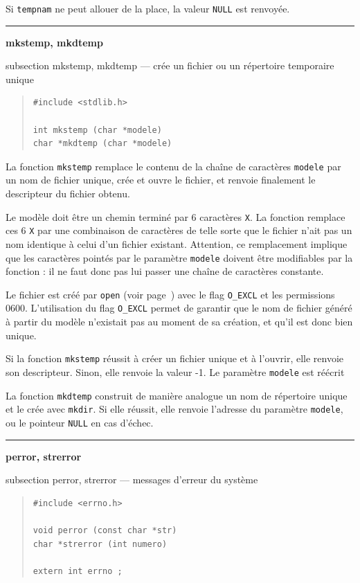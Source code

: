 \documentclass [twoside] {report}
\newcommand {\primitive} [1]
    {
	\phantomsection
	{\large \textbf {#1}}
	\addcontentsline {toc} {subsection} {#1}
    }
\newcommand {\separation}
    {
	\vspace {5mm}
	\nopagebreak
	\hrule
    }
\begin{document}
Si \texttt {tempnam} ne peut allouer de la place, la valeur \texttt {NULL} est
renvoyée.



\separation 
\primitive {mkstemp, mkdtemp} --- crée un fichier ou un répertoire temporaire unique
    \label {mkstemp}

\begin {quote}
\begin {verbatim}
#include <stdlib.h>

int mkstemp (char *modele)
char *mkdtemp (char *modele)
\end{verbatim}
\end {quote}

La fonction \texttt {mkstemp} remplace le contenu de la chaîne de
caractères \texttt {modele} par un nom de fichier unique, crée et
ouvre le fichier, et renvoie finalement le descripteur du fichier obtenu.

Le modèle doit être un chemin terminé par 6 caractères \texttt{X}. La
fonction remplace ces 6 \texttt{X} par une combinaison de caractères
de telle sorte que le fichier n'ait pas un nom identique à celui d'un
fichier existant. Attention, ce remplacement implique que les caractères
pointés par le paramètre \texttt{modele} doivent être modifiables par
la fonction : il ne faut donc pas lui passer une chaîne de caractères
constante.

Le fichier est créé par \texttt {open} (voir page~\pageref {open})
avec le flag \texttt{O\_EXCL} et les permissions 0600. L'utilisation du
flag \texttt{O\_EXCL} permet de garantir que le nom de fichier généré
à partir du modèle n'existait pas au moment de sa création, et qu'il
est donc bien unique.

Si la fonction \texttt {mkstemp} réussit à créer un fichier unique
et à l'ouvrir, elle renvoie son descripteur. Sinon, elle renvoie la
valeur -1. Le paramètre \texttt{modele} est réécrit 

La fonction \texttt {mkdtemp} construit de manière analogue un nom de
répertoire unique et le crée avec \texttt {mkdir}. Si elle réussit,
elle renvoie l'adresse du paramètre \texttt{modele}, ou le pointeur
\texttt {NULL} en cas d'échec.


\separation 
\primitive {perror, strerror} --- messages d'erreur du système

\begin {quote}
\begin {verbatim}
#include <errno.h>

void perror (const char *str)
char *strerror (int numero)

extern int errno ;
\end{verbatim}
\end {quote}
\end{document}
